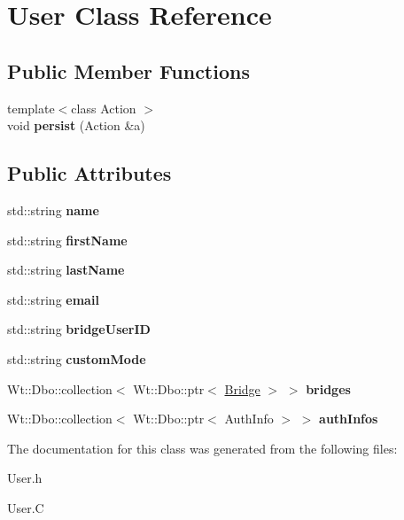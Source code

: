 \hypertarget{classUser}{}\section{User Class Reference}
\label{classUser}
\subsection*{Public Member Functions}
\begin{DoxyCompactItemize}
\item 
{\footnotesize template$<$class Action $>$ }\\void {\bfseries persist} (Action \&a)\hypertarget{classUser_a626b516f8e54e0b98c4b20c488de01b8}{}\label{classUser_a626b516f8e54e0b98c4b20c488de01b8}

\end{DoxyCompactItemize}
\subsection*{Public Attributes}
\begin{DoxyCompactItemize}
\item 
std\+::string {\bfseries name}\hypertarget{classUser_a085d8d69282b6298964eab8351584536}{}\label{classUser_a085d8d69282b6298964eab8351584536}

\item 
std\+::string {\bfseries first\+Name}\hypertarget{classUser_aa845739b31aaf9d2e7bdedf829447191}{}\label{classUser_aa845739b31aaf9d2e7bdedf829447191}

\item 
std\+::string {\bfseries last\+Name}\hypertarget{classUser_a10abe0efedb0a600a7be16593a448b12}{}\label{classUser_a10abe0efedb0a600a7be16593a448b12}

\item 
std\+::string {\bfseries email}\hypertarget{classUser_ac35b7c63228119cb91acdbd7ed32b8cb}{}\label{classUser_ac35b7c63228119cb91acdbd7ed32b8cb}

\item 
std\+::string {\bfseries bridge\+User\+ID}\hypertarget{classUser_aab2b993a0e6512bed3f637338f48d9ac}{}\label{classUser_aab2b993a0e6512bed3f637338f48d9ac}

\item 
std\+::string {\bfseries custom\+Mode}\hypertarget{classUser_a044edce65486d14cfed5f97c753f9d7c}{}\label{classUser_a044edce65486d14cfed5f97c753f9d7c}

\item 
Wt\+::\+Dbo\+::collection$<$ Wt\+::\+Dbo\+::ptr$<$ \hyperlink{classBridge}{Bridge} $>$ $>$ {\bfseries bridges}\hypertarget{classUser_a19170eac8428770570d1e0b826562131}{}\label{classUser_a19170eac8428770570d1e0b826562131}

\item 
Wt\+::\+Dbo\+::collection$<$ Wt\+::\+Dbo\+::ptr$<$ Auth\+Info $>$ $>$ {\bfseries auth\+Infos}\hypertarget{classUser_ae3f58fe31642f514288705f4081031b6}{}\label{classUser_ae3f58fe31642f514288705f4081031b6}

\end{DoxyCompactItemize}


The documentation for this class was generated from the following files\+:\begin{DoxyCompactItemize}
\item 
User.\+h\item 
User.\+C\end{DoxyCompactItemize}
